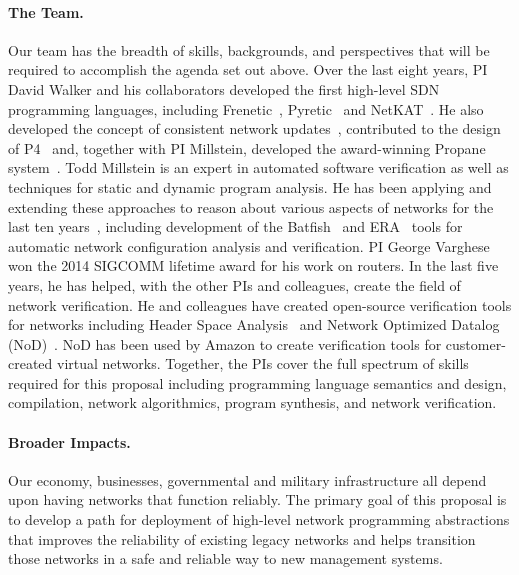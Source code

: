
\paragraph{The Team.}  Our team has the breadth of skills, backgrounds, and perspectives that will be required to accomplish the agenda set out above.  
Over the last eight years, PI David Walker and his collaborators
developed the first high-level SDN programming languages, including
Frenetic~\cite{frenetic}, Pyretic~\cite{pyretic} and NetKAT~\cite{netkat}.
He also developed the concept of consistent network updates~\cite{reitblatt+:consistent-updates},
 contributed to the design of P4~\cite{P4} and, together with PI Millstein, 
developed the award-winning
Propane system~\cite{beckett+:propane}.   Todd Millstein is an expert in automated software verification as well as techniques for static and dynamic program analysis.  He has been applying and extending these approaches to reason about various aspects of networks for the last ten years~\cite{DBLP:conf/pldi/KothariGMG07,gullible,DBLP:conf/sigcomm/KothariMMGM11,DBLP:conf/nsdi/PedrosaFKGMM15}, including development of the Batfish~\cite{batfish} and ERA~\cite{era} tools for automatic network configuration analysis and verification. PI George Varghese won the 2014 SIGCOMM lifetime award for his work on routers.  In the last five years, he has helped, with the other PIs and colleagues, create the field of network verification.  He and colleagues have created open-source verification tools for networks including Header Space Analysis~\cite{hsa} and Network Optimized Datalog (NoD)~\cite{nod}. NoD has been used by Amazon to create verification tools for customer-created virtual networks.  Together, the PIs cover the full spectrum of skills required for this proposal including programming
language semantics and design,
compilation,
network algorithmics,
program synthesis, and
network verification.

\paragraph{Broader Impacts.}  
Our economy, businesses, governmental and military infrastructure all depend upon having networks that function
reliably.  
The primary goal of this proposal is to develop
a path for deployment of high-level network programming abstractions that
improves the reliability of existing legacy networks and helps
transition those networks in a safe and reliable way to new management systems.

